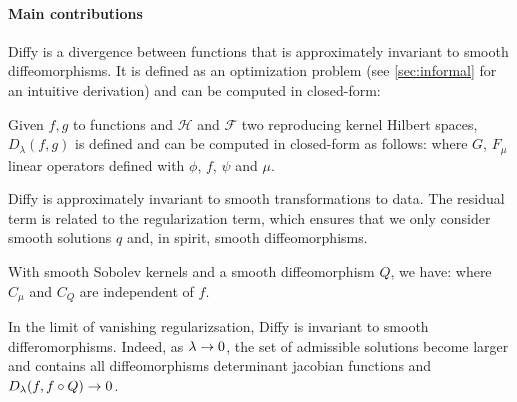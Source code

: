 \paragraph{Main contributions} Diffy is a divergence between functions that is approximately invariant to smooth diffeomorphisms.
It is defined as an optimization problem (see \cref{sec:informal} for an intuitive derivation) and can be computed in closed-form:
\begin{mdframed}
\begin{informaltheorem}
Given $f, g$ to functions and $\mathcal H$ and $\mathcal F$ two reproducing kernel Hilbert spaces, $D_\lambda(f, g)$ is defined and can be computed in closed-form as follows:
where $G$, $F_\mu$ linear operators defined with $\phi$, $f$, $\psi$ and $\mu$.
\end{informaltheorem}
\end{mdframed}

Diffy is approximately invariant to smooth transformations to data. The residual term is related to the regularization term, which ensures that we only consider smooth solutions $q$ and, in spirit, smooth diffeomorphisms.
\begin{mdframed}
\begin{informaltheorem}
With smooth Sobolev kernels and a smooth diffeomorphism $Q$, we have:
where $C_\mu$ and $C_Q$ are independent of $f$.
\end{informaltheorem}
\end{mdframed}
\noindent In the limit of vanishing regularizsation, Diffy is invariant to smooth differomorphisms. Indeed, as $\lambda \to 0$, the set of admissible solutions become larger and contains all diffeomorphisms determinant jacobian functions and $D_\lambda(f, f\circ Q)\to 0$.

